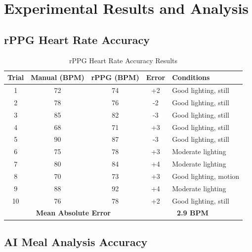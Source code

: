 \documentclass[12pt,a4paper]{report}
\begin{document}
\chapter{Experimental Results and Analysis}

\section{rPPG Heart Rate Accuracy}

\begin{table}[H]
\centering
\caption{rPPG Heart Rate Accuracy Results}
\label{tab:rppg}
\begin{tabular}{|c|c|c|c|l|}
\hline
\textbf{Trial} & \textbf{Manual (BPM)} & \textbf{rPPG (BPM)} & \textbf{Error} & \textbf{Conditions} \\
\hline
1 & 72 & 74 & +2 & Good lighting, still \\
2 & 78 & 76 & -2 & Good lighting, still \\
3 & 85 & 82 & -3 & Good lighting, still \\
4 & 68 & 71 & +3 & Good lighting, still \\
5 & 90 & 87 & -3 & Good lighting, still \\
6 & 75 & 78 & +3 & Moderate lighting \\
7 & 80 & 84 & +4 & Moderate lighting \\
8 & 70 & 73 & +3 & Good lighting, motion \\
9 & 88 & 92 & +4 & Moderate lighting \\
10 & 76 & 78 & +2 & Good lighting, still \\
\hline
\multicolumn{3}{|c|}{\textbf{Mean Absolute Error}} & \multicolumn{2}{c|}{\textbf{2.9 BPM}} \\
\hline
\end{tabular}
\end{table}

\section{AI Meal Analysis Accuracy}
\end{document}
